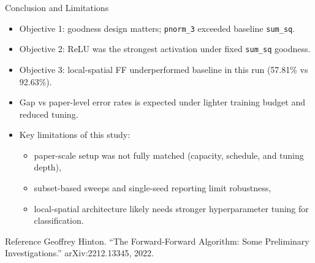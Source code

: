 \documentclass[aspectratio=169]{beamer}
\begin{document}
\begin{frame}{Conclusion and Limitations}
\begin{itemize}
  \item Objective 1: goodness design matters; \texttt{pnorm\_3} exceeded baseline \texttt{sum\_sq}.
  \item Objective 2: ReLU was the strongest activation under fixed \texttt{sum\_sq} goodness.
  \item Objective 3: local-spatial FF underperformed baseline in this run (57.81\% vs 92.63\%).
  \item Gap vs paper-level error rates is expected under lighter training budget and reduced tuning.
  \item Key limitations of this study:
  \begin{itemize}
    \item paper-scale setup was not fully matched (capacity, schedule, and tuning depth),
    \item subset-based sweeps and single-seed reporting limit robustness,
    \item local-spatial architecture likely needs stronger hyperparameter tuning for classification.
  \end{itemize}
\end{itemize}
\end{frame}

\begin{frame}{Reference}
\small
Geoffrey Hinton. ``The Forward-Forward Algorithm: Some Preliminary Investigations.''
arXiv:2212.13345, 2022.
\end{frame}
\end{document}
